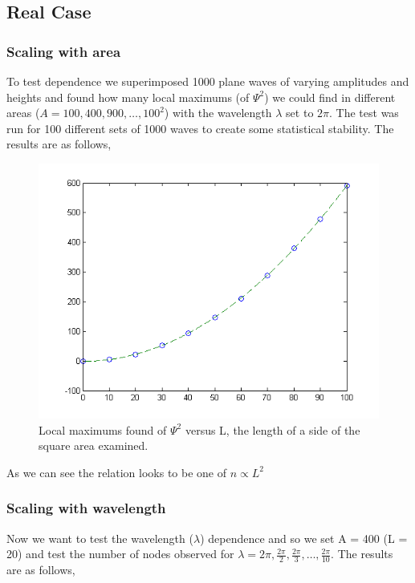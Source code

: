 \documentclass[12pt]{article}
\begin{document}
\subsection{Real Case}

\subsubsection{Scaling with area}

To test dependence we superimposed 1000 plane waves of varying amplitudes and heights and found how many local maximums (of $\Psi^{2}$) we could find in different areas ($A = 100, 400, 900, \ldots, 100^{2}$) with the wavelength $\lambda$ set to $2 \pi$. The test was run for 100 different sets of 1000 waves to create some statistical stability. The results are as follows,

\begin{figure}[ht]
	\centering
		\includegraphics[width=1.00\textwidth]{ascaleSquares.png}
	\caption{Local maximums found of $\Psi^{2}$ versus L, the length of a side of the square area examined.}
	\label{fig:ascaleSquares}
\end{figure}

\pagebreak

As we can see the relation looks to be one of $n \propto L^{2}$

\subsubsection{Scaling with wavelength}

Now we want to test the wavelength ($\lambda$) dependence and so we set A = 400 (L = 20) and test the number of nodes observed for $\lambda = 2 \pi, \frac{2 \pi}{2}, \frac{2 \pi}{3}, \ldots, \frac{2 \pi}{10}$. The results are as follows,
\end{document}
